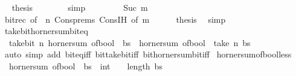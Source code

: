 \begin{isabellebody}
\ \isamarkupfalse%
\ {\isacharquery}{\kern0pt}thesis\isanewline
\ \ \ \ \ \ \isamarkupfalse%
\ simp\isanewline
\ \ \isamarkupfalse%
\isanewline
\ \ \ \ \isamarkupfalse%
\ {\isacharparenleft}{\kern0pt}Suc\ m{\isacharparenright}{\kern0pt}\isanewline
\ \ \ \ \isamarkupfalse%
\ bit{\isacharunderscore}{\kern0pt}rec\ {\isacharbrackleft}{\kern0pt}of\ {\isacharunderscore}{\kern0pt}\ n{\isacharbrackright}{\kern0pt}\ Cons{\isachardot}{\kern0pt}prems\ Cons{\isachardot}{\kern0pt}IH\ {\isacharbrackleft}{\kern0pt}of\ m{\isacharbrackright}{\kern0pt}\isanewline
\ \ \ \ \isamarkupfalse%
\ {\isacharquery}{\kern0pt}thesis\ \isamarkupfalse%
\ simp\isanewline
\ \ \isamarkupfalse%
\isanewline
{}\isamarkupfalse%
%
\endisatagproof
{\isafoldproof}%
%
\isadelimproof
\isanewline
%
\endisadelimproof
\isanewline
{}\isamarkupfalse%
\ take{\isacharunderscore}{\kern0pt}bit{\isacharunderscore}{\kern0pt}horner{\isacharunderscore}{\kern0pt}sum{\isacharunderscore}{\kern0pt}bit{\isacharunderscore}{\kern0pt}eq{\isacharcolon}{\kern0pt}\isanewline
\ \ {\isacartoucheopen}take{\isacharunderscore}{\kern0pt}bit\ n\ {\isacharparenleft}{\kern0pt}horner{\isacharunderscore}{\kern0pt}sum\ of{\isacharunderscore}{\kern0pt}bool\ {}\ bs{\isacharparenright}{\kern0pt}\ {\isacharequal}{\kern0pt}\ horner{\isacharunderscore}{\kern0pt}sum\ of{\isacharunderscore}{\kern0pt}bool\ {}\ {\isacharparenleft}{\kern0pt}take\ n\ bs{\isacharparenright}{\kern0pt}{\isacartoucheclose}\isanewline
%
\isadelimproof
\ \ %
\endisadelimproof
%
\isatagproof
{}\isamarkupfalse%
\ {\isacharparenleft}{\kern0pt}auto\ simp\ add{\isacharcolon}{\kern0pt}\ bit{\isacharunderscore}{\kern0pt}eq{\isacharunderscore}{\kern0pt}iff\ bit{\isacharunderscore}{\kern0pt}take{\isacharunderscore}{\kern0pt}bit{\isacharunderscore}{\kern0pt}iff\ bit{\isacharunderscore}{\kern0pt}horner{\isacharunderscore}{\kern0pt}sum{\isacharunderscore}{\kern0pt}bit{\isacharunderscore}{\kern0pt}iff{\isacharparenright}{\kern0pt}%
\endisatagproof
{\isafoldproof}%
%
\isadelimproof
\isanewline
%
\endisadelimproof
\isanewline
{}\isamarkupfalse%
\isanewline
\isanewline
{}\isamarkupfalse%
\ horner{\isacharunderscore}{\kern0pt}sum{\isacharunderscore}{\kern0pt}of{\isacharunderscore}{\kern0pt}bool{\isacharunderscore}{\kern0pt}{}{\isacharunderscore}{\kern0pt}less{\isacharcolon}{\kern0pt}\isanewline
\ \ {\isacartoucheopen}{\isacharparenleft}{\kern0pt}horner{\isacharunderscore}{\kern0pt}sum\ of{\isacharunderscore}{\kern0pt}bool\ {}\ bs\ {\isacharcolon}{\kern0pt}{\isacharcolon}{\kern0pt}\ int{\isacharparenright}{\kern0pt}\ {\isacharless}{\kern0pt}\ {}\ {\isacharcircum}{\kern0pt}\ length\ bs{\isacartoucheclose}\isanewline

\end{isabellebody}
